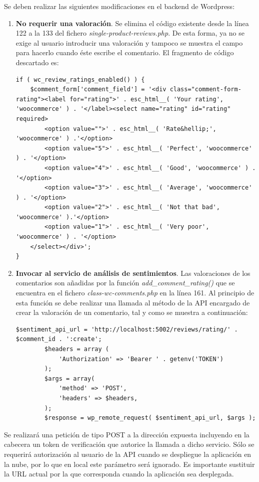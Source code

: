 Se deben realizar las siguientes modificaciones en el backend de Wordpress:
\begin{enumerate}
\item \textbf{No requerir una valoración}. Se elimina el código existente desde la línea 122 a la 133 del fichero \textit{single-product-reviews.php}. De esta forma, ya no se exige al usuario introducir una valoración y tampoco se muestra el campo para hacerlo cuando éste escribe el comentario. El fragmento de código descartado es:

     \begin{lstlisting}[caption= No requerir una valoraci\'on al introducir un comentario]
if ( wc_review_ratings_enabled() ) {
	$comment_form['comment_field'] = '<div class="comment-form-rating"><label for="rating">' . esc_html__( 'Your rating', 'woocommerce' ) . '</label><select name="rating" id="rating" required>
		<option value="">' . esc_html__( 'Rate&hellip;', 'woocommerce' ) .'</option>
		<option value="5">' . esc_html__( 'Perfect', 'woocommerce' ) . '</option>
		<option value="4">' . esc_html__( 'Good', 'woocommerce' ) . '</option>
		<option value="3">' . esc_html__( 'Average', 'woocommerce' ) . '</option>
		<option value="2">' . esc_html__( 'Not that bad', 'woocommerce' ).'</option>
		<option value="1">' . esc_html__( 'Very poor', 'woocommerce' ) . '</option>
	</select></div>';
}
    \end{lstlisting}
\item  \textbf{Invocar al servicio de análisis de sentimientos}. Las valoraciones de los comentarios son añadidas por la función \textit{add\_comment\_rating()} que se encuentra en el fichero \textit{class-wc-comments.php} en la línea 161. Al principio de esta función se debe realizar una llamada al método de la API encargado de crear la valoración de un comentario, tal y como se muestra a continuación: 
    \begin{lstlisting}[caption= Llamar desde Wordpress al servicio de an\'alisis de sentimientos]
        $sentiment_api_url = 'http://localhost:5002/reviews/rating/' . $comment_id . ':create';
		$headers = array (
			'Authorization' => 'Bearer ' . getenv('TOKEN')
		);
		$args = array(
			'method' => 'POST',
			'headers' => $headers,
		);
		$response = wp_remote_request( $sentiment_api_url, $args );
    \end{lstlisting}
\end{enumerate}

Se realizará una petición de tipo POST a la dirección expuesta incluyendo en la cabecera un token de verificación que autorice la llamada a dicho servicio. Sólo se requerirá autorización al usuario de la API cuando se despliegue la aplicación en la nube, por lo que en local este parámetro será ignorado. Es importante sustituir la URL actual por la que corresponda cuando la aplicación sea desplegada.

